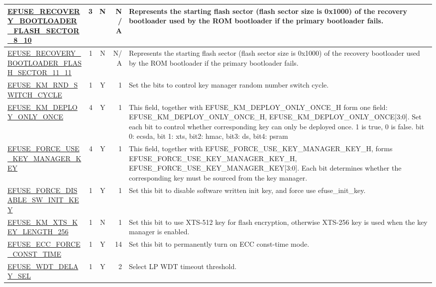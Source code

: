 \begin{longtable}[l]{ |m{8.2cm}|r|c|r|m{9cm}| }
    \hyperref[fielddesc:EFUSERECOVERYBOOTLOADERFLASHSECTOR810]{EFUSE\_RECOVERY\_BOOTLOADER\_FLASH\_\-SECTOR\_8\_10} & 3 & N & N/A & Represents the starting flash sector (flash sector size is 0x1000) of the recovery bootloader used by the ROM bootloader if the primary bootloader fails.  \\ \hline
    \hyperref[fielddesc:EFUSERECOVERYBOOTLOADERFLASHSECTOR1111]{EFUSE\_RECOVERY\_BOOTLOADER\_FLASH\_\-SECTOR\_11\_11} & 1 & N & N/A & Represents the starting flash sector (flash sector size is 0x1000) of the recovery bootloader used by the ROM bootloader if the primary bootloader fails.  \\ \hline
    \hyperref[fielddesc:EFUSEKMRNDSWITCHCYCLE]{EFUSE\_KM\_RND\_SWITCH\_CYCLE} & 1 & Y & 1 & Set the bits to control key manager random number switch cycle.\\ \hline
    \hyperref[fielddesc:EFUSEKMDEPLOYONLYONCE]{EFUSE\_KM\_DEPLOY\_ONLY\_ONCE} & 4 & Y & 1 &  This field, together with EFUSE\_KM\_DEPLOY\_ONLY\_ONCE\_H form one field: {EFUSE\_KM\_DEPLOY\_ONLY\_ONCE\_H, EFUSE\_KM\_DEPLOY\_ONLY\_ONCE[3:0]}. Set each bit to control whether corresponding key can only be deployed once. 1 is true, 0 is false. bit 0: ecsda, bit 1: xts, bit2: hmac, bit3: ds, bit4: psram \\ \hline
    \hyperref[fielddesc:EFUSEFORCEUSEKEYMANAGERKEY]{EFUSE\_FORCE\_USE\_KEY\_MANAGER\_KEY} & 4 & Y & 1 & This field, together with EFUSE\_\-FORCE\_\-USE\_\-KEY\_\-MANAGER\_\-KEY\_\-H, forms {EFUSE\_\-FORCE\_\-USE\_\-KEY\_\-MANAGER\_\-KEY\_\-H, EFUSE\_\-FORCE\_\-USE\_\-KEY\_\-MANAGER\_\-KEY[3:0]}. Each bit determines whether the corresponding key must be sourced from the key manager. \\ \hline
    \hyperref[fielddesc:EFUSEFORCEDISABLESWINITKEY]{EFUSE\_FORCE\_DISABLE\_SW\_INIT\_KEY} & 1 & Y & 1 & Set this bit to disable software written init key, and force use efuse\_init\_key. \\ \hline
    \hyperref[fielddesc:EFUSEKMXTSKEYLENGTH256]{EFUSE\_KM\_XTS\_KEY\_LENGTH\_256} & 1 & N & 1 & Set this bit to use XTS-512 key for flash encryption, otherwise XTS-256 key is used when the key manager is enabled.\\ \hline
    \hyperref[fielddesc:EFUSEECCFORCECONSTTIME]{EFUSE\_ECC\_FORCE\_CONST\_TIME} & 1 & Y & 14 & Set this bit to permanently turn on ECC const-time mode. \\ \hline
    \hyperref[fielddesc:EFUSEWDTDELAYSEL]{EFUSE\_WDT\_DELAY\_SEL} & 1 & Y & 2 & Select LP WDT timeout threshold. \\ \hline

\end{longtable}
